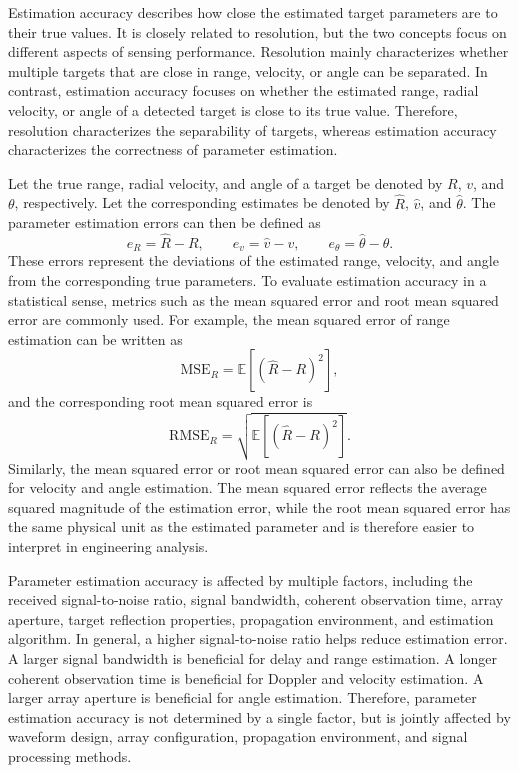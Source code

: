Estimation accuracy describes how close the estimated target parameters are
to their true values.
It is closely related to resolution, but the two concepts focus on different
aspects of sensing performance.
Resolution mainly characterizes whether multiple targets that are close in
range, velocity, or angle can be separated.
In contrast, estimation accuracy focuses on whether the estimated range,
radial velocity, or angle of a detected target is close to its true value.
Therefore, resolution characterizes the separability of targets, whereas
estimation accuracy characterizes the correctness of parameter estimation.

Let the true range, radial velocity, and angle of a target be denoted by
\(R\), \(v\), and \(\theta\), respectively.
Let the corresponding estimates be denoted by \(\hat{R}\), \(\hat{v}\), and
\(\hat{\theta}\).
The parameter estimation errors can then be defined as
\begin{equation}
    e_R=\hat{R}-R,\qquad
    e_v=\hat{v}-v,\qquad
    e_\theta=\hat{\theta}-\theta.
    \label{eq:parameter_estimation_errors}
\end{equation}
These errors represent the deviations of the estimated range, velocity, and
angle from the corresponding true parameters.
To evaluate estimation accuracy in a statistical sense, metrics such as the
mean squared error and root mean squared error are commonly used.
For example, the mean squared error of range estimation can be written as
\begin{equation}
    \mathrm{MSE}_R
    =
    \mathbb{E}\left[(\hat{R}-R)^2\right],
    \label{eq:range_mse}
\end{equation}
and the corresponding root mean squared error is
\begin{equation}
    \mathrm{RMSE}_R
    =
    \sqrt{\mathbb{E}\left[(\hat{R}-R)^2\right]}.
    \label{eq:range_rmse}
\end{equation}
Similarly, the mean squared error or root mean squared error can also be
defined for velocity and angle estimation.
The mean squared error reflects the average squared magnitude of the estimation
error, while the root mean squared error has the same physical unit as the
estimated parameter and is therefore easier to interpret in engineering
analysis.

Parameter estimation accuracy is affected by multiple factors, including the
received signal-to-noise ratio, signal bandwidth, coherent observation time,
array aperture, target reflection properties, propagation environment, and
estimation algorithm.
In general, a higher signal-to-noise ratio helps reduce estimation error.
A larger signal bandwidth is beneficial for delay and range estimation.
A longer coherent observation time is beneficial for Doppler and velocity
estimation.
A larger array aperture is beneficial for angle estimation.
Therefore, parameter estimation accuracy is not determined by a single factor,
but is jointly affected by waveform design, array configuration, propagation
environment, and signal processing methods.

